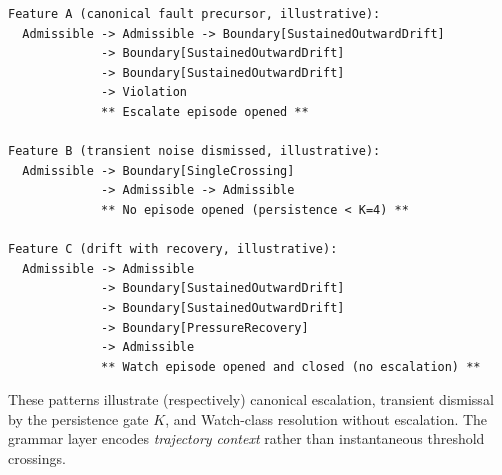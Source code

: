 \documentclass[11pt,letterpaper]{article}
\theoremstyle{scresult}
\begin{document}
\begin{center}
\begin{minipage}{0.94\linewidth}
\begin{verbatim}
Feature A (canonical fault precursor, illustrative):
  Admissible -> Admissible -> Boundary[SustainedOutwardDrift]
             -> Boundary[SustainedOutwardDrift]
             -> Boundary[SustainedOutwardDrift]
             -> Violation
             ** Escalate episode opened **

Feature B (transient noise dismissed, illustrative):
  Admissible -> Boundary[SingleCrossing]
             -> Admissible -> Admissible
             ** No episode opened (persistence < K=4) **

Feature C (drift with recovery, illustrative):
  Admissible -> Admissible
             -> Boundary[SustainedOutwardDrift]
             -> Boundary[SustainedOutwardDrift]
             -> Boundary[PressureRecovery]
             -> Admissible
             ** Watch episode opened and closed (no escalation) **
\end{verbatim}
\end{minipage}
\end{center}

\noindent These patterns illustrate (respectively) canonical escalation,
transient dismissal by the persistence gate $K$, and Watch-class resolution
without escalation. The grammar layer encodes \emph{trajectory context} rather
than instantaneous threshold crossings.
\end{document}
